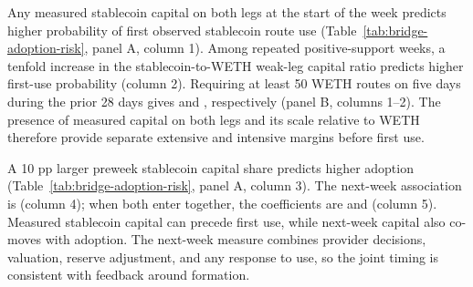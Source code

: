 Any measured stablecoin capital on both legs at the start of the week predicts \BridgeAdoptionRiskAnySupport{} higher probability of first observed stablecoin route use (Table~\ref{tab:bridge-adoption-risk}, panel A, column 1). Among repeated positive-support weeks, a tenfold increase in the stablecoin-to-WETH weak-leg capital ratio predicts \BridgeAdoptionRiskIntensiveTenfold{} higher first-use probability (column 2). Requiring at least 50 WETH routes on five days during the prior 28 days gives \BridgeAdoptionRiskStrictAnySupport{} and \BridgeAdoptionRiskStrictIntensiveTenfold{}, respectively (panel B, columns 1--2). The presence of measured capital on both legs and its scale relative to WETH therefore provide separate extensive and intensive margins before first use.

A 10 pp larger preweek stablecoin capital share predicts \BridgeAdoptionRiskPreweek{} higher adoption (Table~\ref{tab:bridge-adoption-risk}, panel A, column 3). The next-week association is \BridgeAdoptionRiskFuture{} (column 4); when both enter together, the coefficients are \BridgeAdoptionRiskJointPreweek{} and \BridgeAdoptionRiskJointFuture{} (column 5). Measured stablecoin capital can precede first use, while next-week capital also co-moves with adoption. The next-week measure combines provider decisions, valuation, reserve adjustment, and any response to use, so the joint timing is consistent with feedback around formation.


